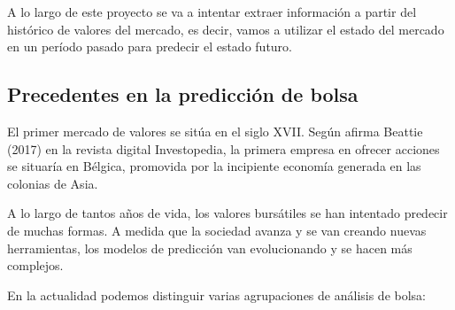 A lo largo de este proyecto se va a intentar extraer informaci\'on a partir del hist\'orico de valores del mercado, es decir, vamos a utilizar el estado del mercado en un per\'iodo pasado para predecir el estado futuro. 


\subsection{Precedentes en la predicci\'on de bolsa}
El primer mercado de valores se sit\'ua en el siglo XVII. Seg\'un afirma Beattie (2017) en la revista digital Investopedia, la primera empresa en ofrecer acciones se situar\'ia en B\'elgica, promovida por la incipiente econom\'ia generada en las colonias de Asia. 

A lo largo de tantos a\~nos de vida, los valores burs\'atiles se han intentado predecir de muchas formas. A medida que la sociedad avanza y se van creando nuevas herramientas, los modelos de predicci\'on van evolucionando y se hacen m\'as complejos.

En la actualidad podemos distinguir varias agrupaciones de an\'alisis de bolsa:

